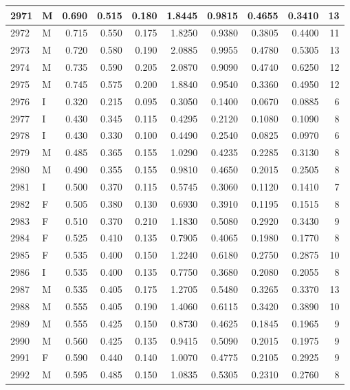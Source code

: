 \documentclass[9pt,twocolumn,twoside,]{pnas-new}
\begin{document}
\begin{tabular}{l|l|r|r|r|r|r|r|r|r}
\hline
2971 & M & 0.690 & 0.515 & 0.180 & 1.8445 & 0.9815 & 0.4655 & 0.3410 & 13\\
\hline
2972 & M & 0.715 & 0.550 & 0.175 & 1.8250 & 0.9380 & 0.3805 & 0.4400 & 11\\
\hline
2973 & M & 0.720 & 0.580 & 0.190 & 2.0885 & 0.9955 & 0.4780 & 0.5305 & 13\\
\hline
2974 & M & 0.735 & 0.590 & 0.205 & 2.0870 & 0.9090 & 0.4740 & 0.6250 & 12\\
\hline
2975 & M & 0.745 & 0.575 & 0.200 & 1.8840 & 0.9540 & 0.3360 & 0.4950 & 12\\
\hline
2976 & I & 0.320 & 0.215 & 0.095 & 0.3050 & 0.1400 & 0.0670 & 0.0885 & 6\\
\hline
2977 & I & 0.430 & 0.345 & 0.115 & 0.4295 & 0.2120 & 0.1080 & 0.1090 & 8\\
\hline
2978 & I & 0.430 & 0.330 & 0.100 & 0.4490 & 0.2540 & 0.0825 & 0.0970 & 6\\
\hline
2979 & M & 0.485 & 0.365 & 0.155 & 1.0290 & 0.4235 & 0.2285 & 0.3130 & 8\\
\hline
2980 & M & 0.490 & 0.355 & 0.155 & 0.9810 & 0.4650 & 0.2015 & 0.2505 & 8\\
\hline
2981 & I & 0.500 & 0.370 & 0.115 & 0.5745 & 0.3060 & 0.1120 & 0.1410 & 7\\
\hline
2982 & F & 0.505 & 0.380 & 0.130 & 0.6930 & 0.3910 & 0.1195 & 0.1515 & 8\\
\hline
2983 & F & 0.510 & 0.370 & 0.210 & 1.1830 & 0.5080 & 0.2920 & 0.3430 & 9\\
\hline
2984 & F & 0.525 & 0.410 & 0.135 & 0.7905 & 0.4065 & 0.1980 & 0.1770 & 8\\
\hline
2985 & F & 0.535 & 0.400 & 0.150 & 1.2240 & 0.6180 & 0.2750 & 0.2875 & 10\\
\hline
2986 & I & 0.535 & 0.400 & 0.135 & 0.7750 & 0.3680 & 0.2080 & 0.2055 & 8\\
\hline
2987 & M & 0.535 & 0.405 & 0.175 & 1.2705 & 0.5480 & 0.3265 & 0.3370 & 13\\
\hline
2988 & M & 0.555 & 0.405 & 0.190 & 1.4060 & 0.6115 & 0.3420 & 0.3890 & 10\\
\hline
2989 & M & 0.555 & 0.425 & 0.150 & 0.8730 & 0.4625 & 0.1845 & 0.1965 & 9\\
\hline
2990 & M & 0.560 & 0.425 & 0.135 & 0.9415 & 0.5090 & 0.2015 & 0.1975 & 9\\
\hline
2991 & F & 0.590 & 0.440 & 0.140 & 1.0070 & 0.4775 & 0.2105 & 0.2925 & 9\\
\hline
2992 & M & 0.595 & 0.485 & 0.150 & 1.0835 & 0.5305 & 0.2310 & 0.2760 & 8\\

\end{tabular}
\end{document}

